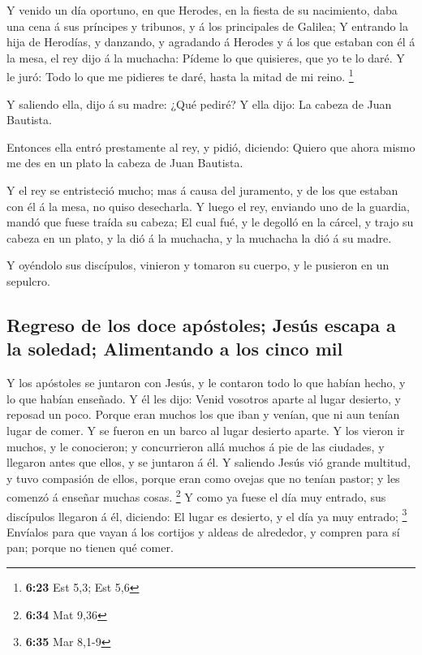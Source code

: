  Y venido un día oportuno, en que Herodes, en la fiesta
de su nacimiento, daba una cena á sus príncipes y tribunos, y á los
principales de Galilea;  Y entrando la hija de Herodías,
y danzando, y agradando á Herodes y á los que estaban con él á la mesa,
el rey dijo á la muchacha: Pídeme lo que quisieres, que yo te lo daré.
 Y le juró: Todo lo que me pidieres te daré, hasta la
mitad de mi reino. \footnote{\textbf{6:23} Est 5,3; Est 5,6}

 Y saliendo ella, dijo á su madre: ¿Qué pediré? Y ella
dijo: La cabeza de Juan Bautista.

 Entonces ella entró prestamente al rey, y pidió,
diciendo: Quiero que ahora mismo me des en un plato la cabeza de Juan
Bautista.

 Y el rey se entristeció mucho; mas á causa del
juramento, y de los que estaban con él á la mesa, no quiso desecharla.
 Y luego el rey, enviando uno de la guardia, mandó que
fuese traída su cabeza;  El cual fué, y le degolló en la
cárcel, y trajo su cabeza en un plato, y la dió á la muchacha, y la
muchacha la dió á su madre.

 Y oyéndolo sus discípulos, vinieron y tomaron su cuerpo,
y le pusieron en un sepulcro.

\hypertarget{regreso-de-los-doce-apuxf3stoles-jesuxfas-escapa-a-la-soledad-alimentando-a-los-cinco-mil}{%
\subsection{Regreso de los doce apóstoles; Jesús escapa a la soledad;
Alimentando a los cinco
mil}\label{regreso-de-los-doce-apuxf3stoles-jesuxfas-escapa-a-la-soledad-alimentando-a-los-cinco-mil}}

 Y los apóstoles se juntaron con Jesús, y le contaron
todo lo que habían hecho, y lo que habían enseñado.  Y él
les dijo: Venid vosotros aparte al lugar desierto, y reposad un poco.
Porque eran muchos los que iban y venían, que ni aun tenían lugar de
comer.  Y se fueron en un barco al lugar desierto aparte.
 Y los vieron ir muchos, y le conocieron; y concurrieron
allá muchos á pie de las ciudades, y llegaron antes que ellos, y se
juntaron á él.  Y saliendo Jesús vió grande multitud, y
tuvo compasión de ellos, porque eran como ovejas que no tenían pastor; y
les comenzó á enseñar muchas cosas. \footnote{\textbf{6:34} Mat 9,36}
 Y como ya fuese el día muy entrado, sus discípulos
llegaron á él, diciendo: El lugar es desierto, y el día ya muy entrado;
\footnote{\textbf{6:35} Mar 8,1-9}  Envíalos para que
vayan á los cortijos y aldeas de alrededor, y compren para sí pan;
porque no tienen qué comer.


